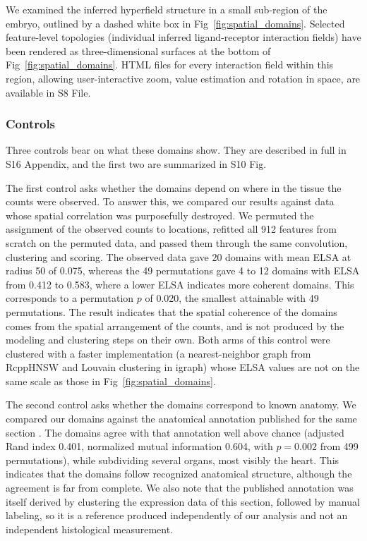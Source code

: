 \documentclass[10pt,letterpaper]{article}
\begin{document}
We examined the inferred hyperfield structure in a small sub-region of the embryo, outlined by a dashed white box in Fig~\ref{fig:spatial_domains}. Selected feature-level topologies (individual inferred ligand-receptor interaction fields) have been rendered as three-dimensional surfaces at the bottom of Fig~\ref{fig:spatial_domains}. HTML files for every interaction field within this region, allowing user-interactive zoom, value estimation and rotation in space, are available in S8 File.

\subsubsection*{Controls}
\label{sec:controls}

Three controls bear on what these domains show. They are described in full in S16 Appendix, and the first two are summarized in S10 Fig.

The first control asks whether the domains depend on where in the tissue the counts were observed. To answer this, we compared our results against data whose spatial correlation was purposefully destroyed. We permuted the assignment of the observed counts to locations, refitted all 912 features from scratch on the permuted data, and passed them through the same convolution, clustering and scoring. The observed data gave 20 domains with mean ELSA at radius 50 of 0.075, whereas the 49 permutations gave 4 to 12 domains with ELSA from 0.412 to 0.583, where a lower ELSA indicates more coherent domains. This corresponds to a permutation $p$ of 0.020, the smallest attainable with 49 permutations. The result indicates that the spatial coherence of the domains comes from the spatial arrangement of the counts, and is not produced by the modeling and clustering steps on their own. Both arms of this control were clustered with a faster implementation (a nearest-neighbor graph from RcppHNSW and Louvain clustering in igraph) whose ELSA values are not on the same scale as those in Fig~\ref{fig:spatial_domains}.

The second control asks whether the domains correspond to known anatomy. We compared our domains against the anatomical annotation published for the same section \cite{Chen2022}. The domains agree with that annotation well above chance (adjusted Rand index 0.401, normalized mutual information 0.604, with $p = 0.002$ from 499 permutations), while subdividing several organs, most visibly the heart. This indicates that the domains follow recognized anatomical structure, although the agreement is far from complete. We also note that the published annotation was itself derived by clustering the expression data of this section, followed by manual labeling, so it is a reference produced independently of our analysis and not an independent histological measurement.
\end{document}
